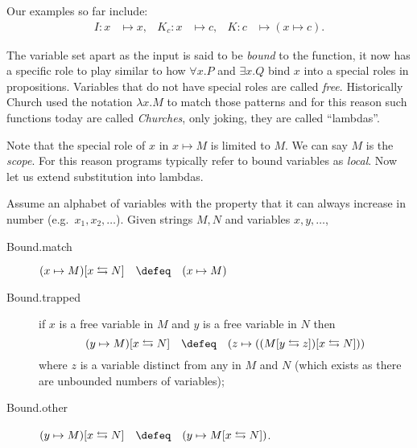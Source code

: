 Our examples so far include:
\begin{align*}
    I:x & \mapsto x, &
    K_c:x & \mapsto c, &
    K: c & \mapsto (x\mapsto c).
\end{align*}



The variable set apart as the input is said to
be \emph{bound} to the function, it now has a specific role to play similar to
how $\forall x.P$  and $\exists x.Q$ bind $x$ into a special roles in propositions.
Variables that do not have special roles are called \emph{free}.  
Historically Church used the notation $\lambda x.M$ to match those 
patterns and for this reason such functions today are called \emph{Churches}, 
only joking, they are called ``lambdas''. 

Note that the special role of $x$ in $x\mapsto M$ is limited to $M$.  We can say
$M$ is the \emph{scope}.   For this reason programs typically refer to bound
variables as \emph{local}.  Now let us extend substitution into lambdas.
\begin{definition}
    Assume an alphabet of variables with the property that it can always increase in number
    (e.g.\ $x_1, x_2,\ldots$).
Given strings $M,N$ and variables $x,y,\ldots$,
\begin{description}
    \item[Bound.match] $(x\mapsto M)[x\leftrightarrows N]\quad \defeq\quad (x\mapsto M)$
    \item[Bound.trapped]
    if $x$ is a free variable in $M$ and $y$ is a free variable in $N$ then 
    \[ 
        (y\mapsto M)[x\leftrightarrows N]
        \quad \defeq\quad 
        (z\mapsto ((M[y\leftrightarrows z])[x\leftrightarrows N]))
    \]
    where 
    $z$ is a variable distinct from any in $M$ and $N$ (which exists 
    as there are unbounded numbers of variables);

    \item[Bound.other] $(y\mapsto M)[x\leftrightarrows N]\quad \defeq\quad 
    (y\mapsto M[x\leftrightarrows N])$.
\end{description}
\end{definition}

